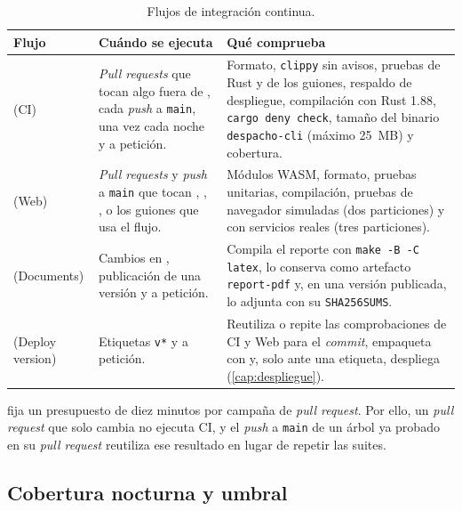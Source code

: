 \begin{table}[H]
  \centering
  \caption{Flujos de integración continua.}\label{tab:mant-flujos}
  \begin{tabularx}{\textwidth}{L{2.7cm} L{4.3cm} Y}
    \toprule
    \textbf{Flujo} & \textbf{Cuándo se ejecuta} & \textbf{Qué comprueba} \\
    \midrule
     (CI)
      & \emph{Pull requests} que tocan algo fuera de , cada
        \emph{push} a \texttt{main}, una vez cada noche y a petición.
      & Formato, \texttt{clippy} sin avisos, pruebas de Rust y de los
        guiones, respaldo de despliegue, compilación con Rust 1.88,
        \texttt{cargo deny check}, tamaño del binario \texttt{despacho-cli}
        (máximo 25~MB) y cobertura. \\
     (Web)
      & \emph{Pull requests} y \emph{push} a \texttt{main} que tocan
        , , ,
         o los guiones que usa el flujo.
      & Módulos WASM, formato, pruebas unitarias, compilación, pruebas de
        navegador simuladas (dos particiones) y con servicios reales (tres
        particiones). \\
     (Documents)
      & Cambios en , publicación de una versión y a
        petición.
      & Compila el reporte con \texttt{make -B -C latex}, lo conserva como
        artefacto \texttt{report-pdf} y, en una versión publicada, lo adjunta
        con su \texttt{SHA256SUMS}. \\
     (Deploy version)
      & Etiquetas \texttt{v*} y a petición.
      & Reutiliza o repite las comprobaciones de CI y Web para el
        \emph{commit}, empaqueta con  y,
        solo ante una etiqueta, despliega (\cref{cap:despliegue}). \\
    \bottomrule
  \end{tabularx}
\end{table}

 fija un presupuesto de diez minutos
por campaña de \emph{pull request}. Por ello, un \emph{pull request} que solo
cambia  no ejecuta CI, y el \emph{push} a \texttt{main} de un
árbol ya probado en su \emph{pull request} reutiliza ese resultado en lugar de
repetir las suites.

\subsection{Cobertura nocturna y umbral}\label{sec:mant-cobertura}

